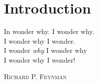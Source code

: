 \chapter{Introduction}

\epigraph{
In wonder why. I wonder why.\\
I wonder why I wonder.\\
I wonder \emph{why} I wonder why\\
I wonder why I wonder!
}
{\textsc{Richard P. Feynman}}